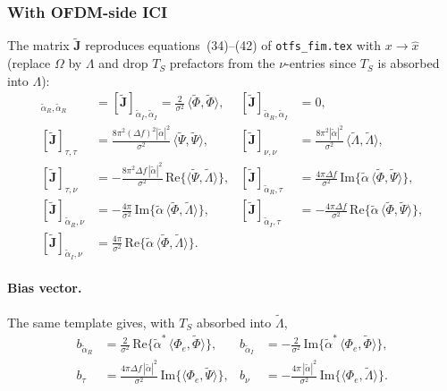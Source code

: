 \documentclass[11pt]{article}
\begin{document}
\subsubsection{With OFDM-side ICI}

The matrix \(\tilde{\bm{J}}\) reproduces equations~(34)--(42) of \texttt{otfs\_fim.tex} with \(x \to \hat{x}\) (replace \(\Omega\) by \(\Lambda\) and drop \(T_S\) prefactors from the \(\nu\)-entries since \(T_S\) is absorbed into \(\Lambda\)):
\begin{align}
    [\tilde{\bm{J}}]_{\tilde{\alpha}_R, \tilde{\alpha}_R} &= [\tilde{\bm{J}}]_{\tilde{\alpha}_I, \tilde{\alpha}_I} = \tfrac{2}{\sigma^2}\, \langle \tilde{\Phi},\tilde{\Phi}\rangle, &
    [\tilde{\bm{J}}]_{\tilde{\alpha}_R, \tilde{\alpha}_I} &= 0, \\
    [\tilde{\bm{J}}]_{\tau, \tau} &= \tfrac{8\pi^2 (\Delta f)^2 |\tilde{\alpha}|^2}{\sigma^2}\, \langle \tilde{\Psi},\tilde{\Psi}\rangle, &
    [\tilde{\bm{J}}]_{\nu, \nu} &= \tfrac{8\pi^2 |\tilde{\alpha}|^2}{\sigma^2}\, \langle \tilde{\Lambda},\tilde{\Lambda}\rangle, \\
    [\tilde{\bm{J}}]_{\tau, \nu} &= -\tfrac{8\pi^2 \Delta f\, |\tilde{\alpha}|^2}{\sigma^2}\, \mathrm{Re}\{\langle \tilde{\Psi},\tilde{\Lambda}\rangle\}, &
    [\tilde{\bm{J}}]_{\tilde{\alpha}_R, \tau} &= \tfrac{4\pi\Delta f}{\sigma^2}\, \mathrm{Im}\{\tilde{\alpha}\, \langle \tilde{\Phi},\tilde{\Psi}\rangle\}, \\
    [\tilde{\bm{J}}]_{\tilde{\alpha}_R, \nu} &= -\tfrac{4\pi}{\sigma^2}\, \mathrm{Im}\{\tilde{\alpha}\, \langle \tilde{\Phi},\tilde{\Lambda}\rangle\}, &
    [\tilde{\bm{J}}]_{\tilde{\alpha}_I, \tau} &= -\tfrac{4\pi\Delta f}{\sigma^2}\, \mathrm{Re}\{\tilde{\alpha}\, \langle \tilde{\Phi},\tilde{\Psi}\rangle\}, \\
    [\tilde{\bm{J}}]_{\tilde{\alpha}_I, \nu} &= \tfrac{4\pi}{\sigma^2}\, \mathrm{Re}\{\tilde{\alpha}\, \langle \tilde{\Phi},\tilde{\Lambda}\rangle\}. & &
\end{align}

\paragraph{Bias vector.} The same template gives, with \(T_S\) absorbed into \(\tilde{\Lambda}\),
\begin{align}
    b_{\tilde{\alpha}_R} &= \tfrac{2}{\sigma^2}\, \mathrm{Re}\{\tilde{\alpha}^*\, \langle \Phi_e, \tilde{\Phi}\rangle\}, &
    b_{\tilde{\alpha}_I} &= -\tfrac{2}{\sigma^2}\, \mathrm{Im}\{\tilde{\alpha}^*\, \langle \Phi_e, \tilde{\Phi}\rangle\}, \\
    b_\tau &= \tfrac{4\pi\Delta f\, |\tilde{\alpha}|^2}{\sigma^2}\, \mathrm{Im}\{\langle \Phi_e, \tilde{\Psi}\rangle\}, &
    b_\nu &= -\tfrac{4\pi\, |\tilde{\alpha}|^2}{\sigma^2}\, \mathrm{Im}\{\langle \Phi_e, \tilde{\Lambda}\rangle\}.
\end{align}
\end{document}
